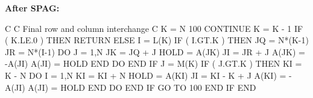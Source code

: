 \documentclass[11pt,twoside,nolof]{starlink}
\begin{document}
\begin {center}
{\bf\large After SPAG:}
\end {center}
\begin {terminalv}
C
C  Final row and column interchange
C
      K = N
 100  CONTINUE
      K = K - 1
      IF ( K.LE.0 ) THEN
         RETURN
      ELSE
         I = L(K)
         IF ( I.GT.K ) THEN
            JQ = N*(K-1)
            JR = N*(I-1)
            DO J = 1,N
               JK = JQ + J
               HOLD = A(JK)
               JI = JR + J
               A(JK) = -A(JI)
               A(JI) = HOLD
            END DO
         END IF
         J = M(K)
         IF ( J.GT.K ) THEN
            KI = K - N
            DO I = 1,N
               KI = KI + N
               HOLD = A(KI)
               JI = KI - K + J
               A(KI) = -A(JI)
               A(JI) = HOLD
            END DO
         END IF
         GO TO 100
      END IF
      END
\end{terminalv}
\end{document}
